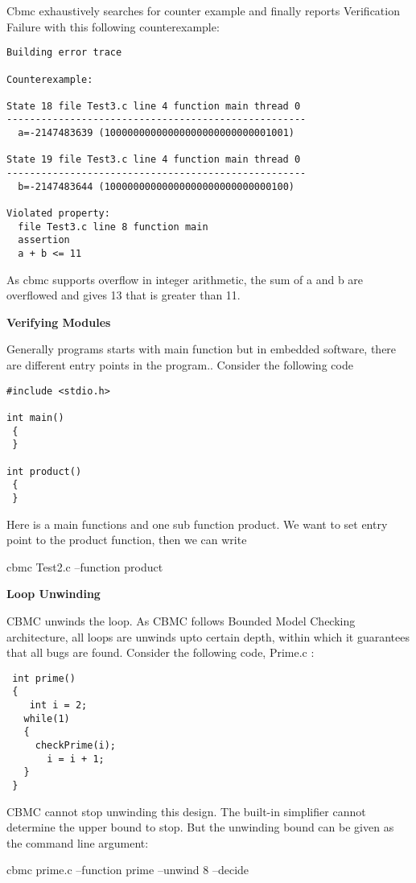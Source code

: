 Cbmc exhaustively searches for counter example  and finally reports Verification 
Failure with this following counterexample:
\begin{verbatim}
Building error trace

Counterexample:

State 18 file Test3.c line 4 function main thread 0
----------------------------------------------------
  a=-2147483639 (10000000000000000000000000001001)

State 19 file Test3.c line 4 function main thread 0
----------------------------------------------------
  b=-2147483644 (10000000000000000000000000000100)

Violated property:
  file Test3.c line 8 function main
  assertion
  a + b <= 11
\end{verbatim}

As cbmc supports overflow in integer arithmetic, the sum of a and b are overflowed
and gives 13 that is greater than 11.


\textbf{Verifying Modules}
 
Generally programs starts with main function but in embedded software, there are
different entry points in the program.. Consider the following code
\begin{verbatim}
#include <stdio.h>
 
int main()
 {   
 }
 
int product()
 {
 }
\end{verbatim}
 
Here is a main functions and one sub function product. We want to set entry point 
to the product function, then we can write

cbmc Test2.c --function product
 
\textbf{Loop Unwinding}
 
CBMC unwinds the loop. As CBMC follows Bounded Model Checking architecture, all
loops are unwinds upto certain depth, within which it guarantees that all bugs 
are found. Consider the following code, Prime.c :
 
\begin{verbatim}
 int prime()
 {
    int i = 2;
   while(1)
   {
     checkPrime(i);
       i = i + 1;
   }
 }
\end{verbatim}
CBMC cannot stop unwinding this design. The built-in simplifier cannot determine
the upper bound to stop. But the unwinding bound can be given as the command line
argument:

cbmc prime.c --function prime --unwind 8 --decide

